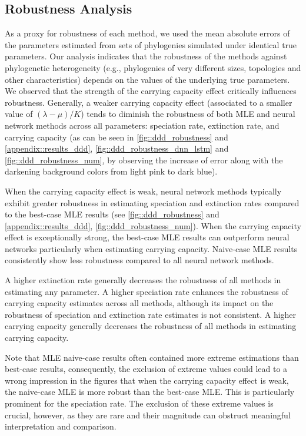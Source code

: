 {\subsection{Robustness Analysis}
\label{ch2::sec::results::robustness}
As a proxy for robustness of each method, we used the mean absolute errors of the parameters estimated from sets of phylogenies simulated under identical true parameters. Our analysis indicates that the robustness of the methods against phylogenetic heterogeneity (e.g., phylogenies of very different sizes, topologies and other characteristics) depends on the values of the underlying true parameters. We observed that the strength of the carrying capacity effect critically influences robustness. Generally, a weaker carrying capacity effect (associated to a smaller value of $(\lambda-\mu) / K$) tends to diminish the robustness of both MLE and neural network methods across all parameters: speciation rate, extinction rate, and carrying capacity (as can be seen in \autoref{fig::ddd_robustness} and \autoref{appendix::results_ddd}, \autoref{fig::ddd_robustness_dnn_lstm} and \autoref{fig::ddd_robustness_num}, by observing the increase of error along with the darkening background colors from light pink to dark blue). 

When the carrying capacity effect is weak, neural network methods typically exhibit greater robustness in estimating speciation and extinction rates compared to the best-case MLE results (see \autoref{fig::ddd_robustness} and \autoref{appendix::results_ddd}, \autoref{fig::ddd_robustness_num}). When the carrying capacity effect is exceptionally strong, the best-case MLE results can outperform neural networks particularly when estimating carrying capacity. Naive-case MLE results consistently show less robustness compared to all neural network methods.

A higher extinction rate generally decreases the robustness of all methods in estimating any parameter. A higher speciation rate enhances the robustness of carrying capacity estimates across all methods, although its impact on the robustness of speciation and extinction rate estimates is not consistent. A higher carrying capacity generally decreases the robustness of all methods in estimating carrying capacity.

Note that MLE naive-case results often contained more extreme estimations than best-case results, consequently, the exclusion of extreme values could lead to a wrong impression in the figures that when the carrying capacity effect is weak, the naive-case MLE is more robust than the best-case MLE. This is particularly prominent for the speciation rate. The exclusion of these extreme values is crucial, however, as they are rare and their magnitude can obstruct meaningful interpretation and comparison.

}
